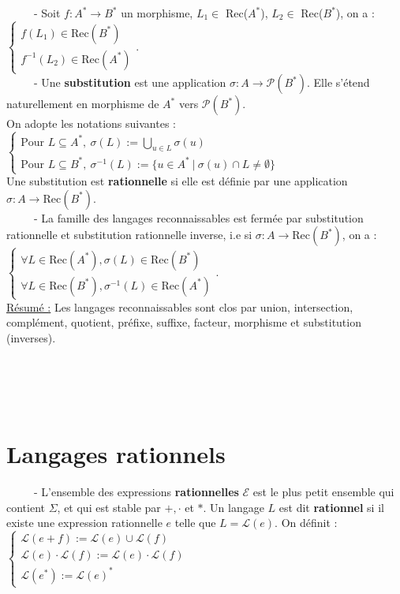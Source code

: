 \documentclass[11pt,a4paper]{article}
\begin{document}
\ \ \ \ \ - Soit $f : A^* \to B^*$ un morphisme, $L_1 \in$ Rec($A^*$),  $L_2 \in$ Rec($B^*$), on a : $\begin{cases} f(L_1) \in \text{Rec}(B^*) \\ f^{-1}(L_2) \in \text{Rec}(A^*) \end{cases}$. \\

\ \ \ \ \ - Une \textbf{substitution} est une application $\sigma : A \to \mathcal{P}(B^*)$. Elle s'étend naturellement en morphisme de $A^*$ vers $\mathcal{P}(B^*)$. \\ On adopte les notations suivantes : $\begin{cases} \text{Pour } L \subseteq A^*, \ \sigma(L) := \bigcup\limits_{u \in L} \sigma(u) \\ \text{Pour } L \subseteq B^*, \ \sigma^{-1}(L) := \{u \in A^* \ | \ \sigma(u)\cap L \neq \emptyset \} \end{cases}$ \\

Une substitution est \textbf{rationnelle} si elle est définie par une application $\sigma : A \to \text{Rec}(B^*)$. \\

\ \ \ \ \ - La famille des langages reconnaissables est fermée par substitution rationnelle et substitution rationnelle inverse, i.e si $\sigma : A \to \text{Rec}(B^*)$, on a :$\begin{cases} \forall L \in \text{Rec}(A^*), \sigma(L) \in \text{Rec}(B^*) \\ \forall L \in \text{Rec}(B^*), \sigma^{-1}(L) \in \text{Rec}(A^*) \end{cases}$. \\

\underline{Résumé :} Les langages reconnaissables sont clos par union, intersection, complément, quotient, préfixe, suffixe, facteur, morphisme et substitution (inverses). \\ \\ \\ \\ \\

\section{Langages rationnels}
\ \ \ \ \ - L'ensemble des expressions \textbf{rationnelles} $\mathcal{E}$ est le plus petit ensemble qui contient $\Sigma$, et qui est stable par $+, \cdot$ et  $*$. Un langage $L$ est dit \textbf{rationnel} si il existe une expression rationnelle $e$ telle que $L = \mathcal{L}(e)$. On définit : $ \begin{cases} \mathcal{L}(e+f) :=\mathcal{L}(e)\cup \mathcal{L}(f) \\ \mathcal{L}(e) \cdot \mathcal{L}(f):= \mathcal{L}(e)\cdot \mathcal{L}(f) \\ \mathcal{L}(e^*):=\mathcal{L}(e)^* \end{cases}$ \\
\end{document}
